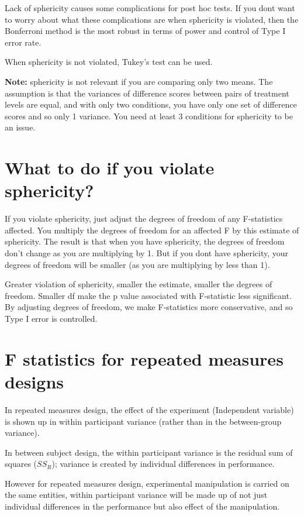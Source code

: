 Lack of sphericity causes some complications for post hoc tests. If you dont want to worry about what these complications are when sphericity is violated, then the Bonferroni method is the most robust in terms of power and control of Type I error rate.

When sphericity is not violated, Tukey's test can be used.

\textbf{Note:} sphericity is not relevant if you are comparing only two means. The assumption is that the variances of difference scores between pairs of treatment levels are equal, and with only two conditions, you have only one set of difference scores and so only 1 variance. You need at least 3 conditions for sphericity to be an issue. 


\section{What to do if you violate sphericity?}
If you violate sphericity, just adjust the degrees of freedom of any F-statistics affected. You multiply the degrees of freedom for an affected F by this estimate of sphericity. The result is that when you have sphericity, the degrees of freedom don't change as you are multiplying by 1. But if you dont have sphericity, your degrees of freedom will be smaller (as you are multiplying by less than 1).

Greater violation of sphericity, smaller the estimate, smaller the degrees of freedom.
Smaller df make the p value associated with F-statistic less significant. By adjusting degrees of freedom, we make F-statistics more conservative, and so Type I error is controlled.

\section{F statistics for repeated measures designs}
In repeated measures design, the effect of the experiment (Independent variable) is shown up in within participant variance (rather than in the between-group variance).

In between subject design, the within participant variance is the residual sum of squares ($SS_R$); variance is created by individual differences in performance.

However for repeated measures design, experimental manipulation is carried on the same entities, within participant variance will be made up of not just individual differences in the performance but also effect of the manipulation.



